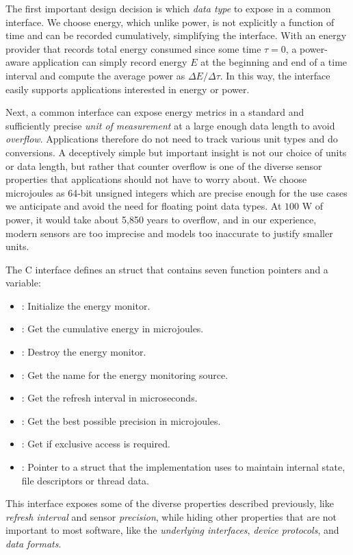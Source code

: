 The first important design decision is which \emph{data type} to expose in a common interface.
We choose energy, which unlike power, is not explicitly a function of time and can be recorded cumulatively, simplifying the interface.
With an energy provider that records total energy consumed since some time $\tau = 0$, a power-aware application can simply record energy $E$ at the beginning and end of a time interval and compute the average power as $\Delta E / \Delta \tau$.
In this way, the interface easily supports applications interested in energy or power.

Next, a common interface can expose energy metrics in a standard and sufficiently precise \emph{unit of measurement} at a large enough data length to avoid \emph{overflow}.
Applications therefore do not need to track various unit types and do conversions.
A deceptively simple but important insight is not our choice of units or data length, but rather that counter overflow is one of the diverse sensor properties that applications should not have to worry about.
We choose microjoules as 64-bit unsigned integers which are precise enough for the use cases we anticipate and avoid the need for floating point data types.
At $100$ W of power, it would take about 5,850 years to overflow, and in our experience, modern sensors are too imprecise and models too inaccurate to justify smaller units.

The  C interface defines an  struct that contains seven function pointers and a  variable:
\begin{itemize}
\item {}: Initialize the energy monitor.
\item {}: Get the cumulative energy in microjoules.
\item {}: Destroy the energy monitor.
\item {}: Get the name for the energy monitoring source.
\item {}: Get the refresh interval in microseconds.
\item {}: Get the best possible precision in microjoules.
\item {}: Get if exclusive access is required.
\item {}: Pointer to a struct that the implementation uses to maintain internal state, \eg file descriptors or thread data.
\end{itemize}
This interface exposes some of the diverse properties described previously, like \emph{refresh interval} and sensor \emph{precision}, while hiding other properties that are not important to most software, like the \emph{underlying interfaces}, \emph{device protocols}, and \emph{data formats}.

